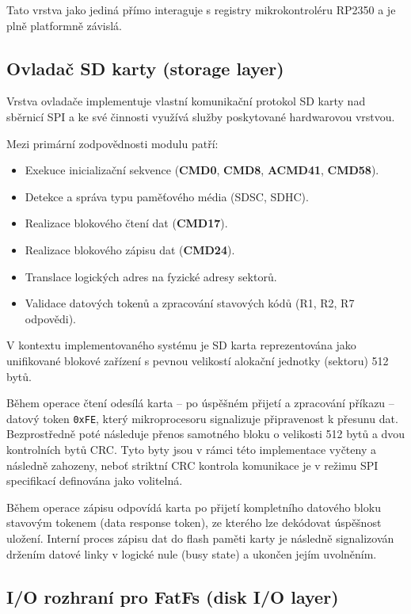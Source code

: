 \documentclass[11pt, a4paper, plain]{article}
\begin{document}
Tato vrstva jako jediná přímo interaguje s registry mikrokontroléru RP2350 a je plně platformně
závislá.

\subsection{Ovladač SD karty (storage layer)}

Vrstva ovladače implementuje vlastní komunikační protokol SD karty nad sběrnicí SPI a ke své
činnosti využívá služby poskytované hardwarovou vrstvou.

Mezi primární zodpovědnosti modulu patří:

\begin{itemize}
    \item Exekuce inicializační sekvence (\textbf{CMD0}, \textbf{CMD8}, \textbf{ACMD41},
        \textbf{CMD58}).
    \item Detekce a správa typu paměťového média (SDSC, SDHC).
    \item Realizace blokového čtení dat (\textbf{CMD17}).
    \item Realizace blokového zápisu dat (\textbf{CMD24}).
    \item Translace logických adres na fyzické adresy sektorů.
    \item Validace datových tokenů a zpracování stavových kódů (R1, R2, R7 odpovědi).
\end{itemize}

V kontextu implementovaného systému je SD karta reprezentována jako unifikované blokové zařízení s
pevnou velikostí alokační jednotky (sektoru) 512 bytů.

Během operace čtení odesílá karta – po úspěšném přijetí a zpracování příkazu – datový token
\texttt{0xFE}, který mikroprocesoru signalizuje připravenost k přesunu dat. Bezprostředně poté
následuje přenos samotného bloku o velikosti 512 bytů a dvou kontrolních bytů CRC. Tyto
byty jsou v rámci této implementace vyčteny a následně zahozeny, neboť striktní CRC kontrola
komunikace je v režimu SPI specifikací definována jako volitelná.

Během operace zápisu odpovídá karta po přijetí kompletního datového bloku stavovým tokenem (data
response token), ze kterého lze dekódovat úspěšnost uložení. Interní proces zápisu dat do flash
paměti karty je následně signalizován držením datové linky v logické nule (busy state) a ukončen
jejím uvolněním.

\subsection{I/O rozhraní pro FatFs (disk I/O layer)}
\end{document}
